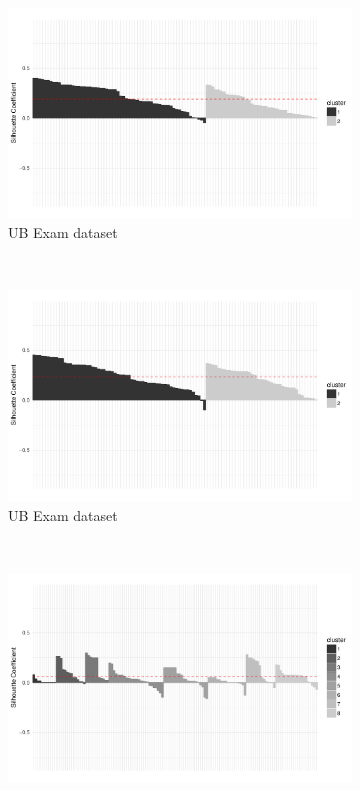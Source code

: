 \begin{figure}[h!]
\begin{subfigure}[b]{0.45\textwidth}
        \includegraphics[width=\textwidth]{TKDE-QuerySimilarity/graphics/sil_ub_Aligon}
        \caption{UB Exam dataset}
        \label{fig:sil_aligon:local}
    \end{subfigure}
    ~
	\begin{subfigure}[b]{0.45\textwidth}%
        \centering
        \includegraphics[width=\textwidth]{TKDE-QuerySimilarity/graphics/sil_ub_Aligon_regularization}
        \caption{UB Exam dataset}
        \label{fig:sil_aligon:local_preprocess}
    \end{subfigure}    
    \\
    \begin{subfigure}[b]{0.45\textwidth}%
        \centering
        \includegraphics[width=\textwidth]{TKDE-QuerySimilarity/graphics/sil_googleplus_Aligon}

\end{subfigure}
\end{figure}
